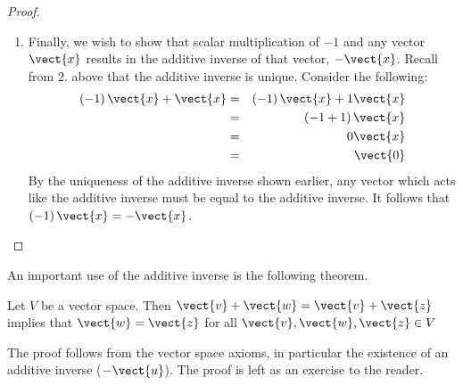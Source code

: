 \begin{proof}
\begin{enumerate}
\item
Finally, we wish to show that scalar multiplication of $-1$ and any vector $\vect{x}$ results in the additive inverse of that vector, $-\vect{x}$. Recall from $2.$ above that the additive inverse is unique. 
Consider the following: 
\begin{eqnarray*}
\left( -1\right) \vect{x}+\vect{x} & =&\left( -1\right) \vect{x}+1\vect{x}\\
&=&\left(-1+1\right) \vect{x} \\
&=&0\vect{x} \\
&=&\vect{0}
\end{eqnarray*}
By the uniqueness of the additive inverse shown earlier, any vector which acts like the additive inverse must be equal to the additive inverse. It follows that $\left( -1\right) 
\vect{x}=-\vect{x}$.
\end{enumerate}
\end{proof}

An important use of the additive inverse is the following theorem.

\begin{theorem}{}{}
Let $V$ be a vector space. Then $\vect{v} + \vect{w} = \vect{v} + \vect{z}$ implies that $\vect{w} = \vect{z}$ for all $\vect{v}, \vect{w}, \vect{z} \in V$
\end{theorem}

The proof follows from the vector space axioms, in particular the existence of an additive inverse ($-\vect{u}$). The proof is left as an exercise to the reader. 
